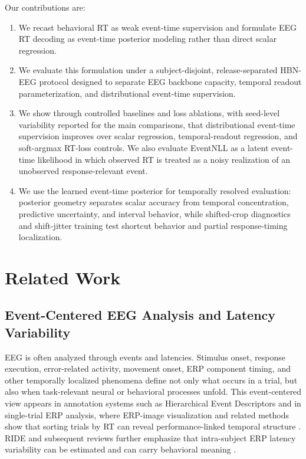 \documentclass[12pt]{article}
\begin{document}
Our contributions are:
\begin{enumerate}
    \item We recast behavioral RT as weak event-time supervision and formulate EEG RT decoding as event-time posterior modeling rather than direct scalar regression.
    \item We evaluate this formulation under a subject-disjoint, release-separated HBN-EEG protocol designed to separate EEG backbone capacity, temporal readout parameterization, and distributional event-time supervision.
    \item We show through controlled baselines and loss ablations, with seed-level variability reported for the main comparisons, that distributional event-time supervision improves over scalar regression, temporal-readout regression, and soft-argmax RT-loss controls. We also evaluate EventNLL as a latent event-time likelihood in which observed RT is treated as a noisy realization of an unobserved response-relevant event.
    \item We use the learned event-time posterior for temporally resolved evaluation: posterior geometry separates scalar accuracy from temporal concentration, predictive uncertainty, and interval behavior, while shifted-crop diagnostics and shift-jitter training test shortcut behavior and partial response-timing localization.
\end{enumerate}

\section{Related Work}

\subsection{Event-Centered EEG Analysis and Latency Variability}
EEG is often analyzed through events and latencies. Stimulus onset, response execution, error-related activity, movement onset, ERP component timing, and other temporally localized phenomena define not only what occurs in a trial, but also when task-relevant neural or behavioral processes unfold. This event-centered view appears in annotation systems such as Hierarchical Event Descriptors \citep{BigdelyShamlo2016HED} and in single-trial ERP analysis, where ERP-image visualization and related methods show that sorting trials by RT can reveal performance-linked temporal structure \citep{Jung1998SingleTrialERP}. RIDE and subsequent reviews further emphasize that intra-subject ERP latency variability can be estimated and can carry behavioral meaning \citep{Ouyang2011RIDE,Ouyang2017LatencyReview}.
\end{document}
